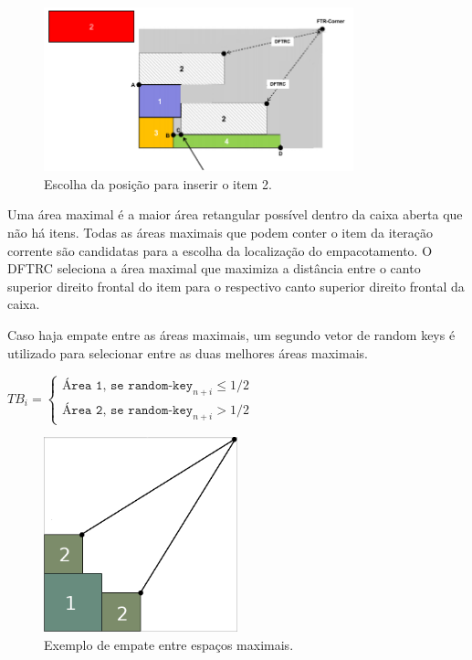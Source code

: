 \documentclass[article]{rian_article}
\begin{document}
\begin{figure}[hbt]
	\centering
	\includegraphics[width=0.8\textwidth]{figs/dftrc.png}
	\caption{Escolha da posição para inserir o item 2.} \label{fig:dftrc}
\end{figure}

Uma área maximal é a maior área retangular possível dentro da caixa aberta que não há itens. Todas as áreas maximais que podem conter o item da iteração corrente são candidatas para a escolha da localização do empacotamento. O DFTRC seleciona a área maximal que maximiza a distância entre o canto superior direito frontal do item para o respectivo canto superior direito frontal da caixa.

Caso haja empate entre as áreas maximais, um segundo vetor de random keys é utilizado para selecionar entre as duas melhores áreas maximais.

\begin{center}
$TB_{i} = \begin{cases}\texttt{Área 1, se random-key}_{n + i} \leq 1/2\\
				\texttt{Área 2, se random-key}_{n + i} > 1/2\end{cases}$
\end{center}
\begin{figure}[hbt]
	\centering
	\includegraphics[width=0.5\textwidth]{figs/tie_breaker.png}
	\caption{Exemplo de empate entre espaços maximais.} \label{fig:empate}
\end{figure}
\end{document}
